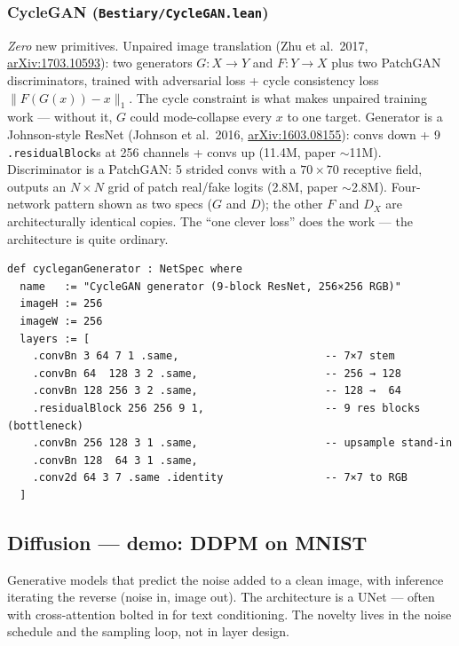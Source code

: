 \subsubsection*{CycleGAN (\texttt{Bestiary/CycleGAN.lean})}
\emph{Zero} new primitives. Unpaired image translation (Zhu et
al.\ 2017, \href{https://arxiv.org/abs/1703.10593}{arXiv:1703.10593}): two generators $G : X \to Y$ and $F : Y \to X$ plus two
PatchGAN discriminators, trained with adversarial loss + cycle
consistency loss $\|F(G(x)) - x\|_1$. The cycle constraint is what
makes unpaired training work --- without it, $G$ could mode-collapse
every $x$ to one target. Generator is a Johnson-style ResNet (Johnson et al.\ 2016,
\href{https://arxiv.org/abs/1603.08155}{arXiv:1603.08155}):
convs down + 9 \texttt{.residualBlock}s at 256 channels + convs up
(11.4M, paper $\sim$11M). Discriminator is a PatchGAN: 5 strided
convs with a $70 \times 70$ receptive field, outputs an $N \times N$
grid of patch real/fake logits (2.8M, paper $\sim$2.8M). Four-network
pattern shown as two specs ($G$ and $D$); the other $F$ and
$D_X$ are architecturally identical copies. The ``one clever loss''
does the work --- the architecture is quite ordinary.

\begin{verbatim}
def cycleganGenerator : NetSpec where
  name   := "CycleGAN generator (9-block ResNet, 256×256 RGB)"
  imageH := 256
  imageW := 256
  layers := [
    .convBn 3 64 7 1 .same,                       -- 7×7 stem
    .convBn 64  128 3 2 .same,                    -- 256 → 128
    .convBn 128 256 3 2 .same,                    -- 128 →  64
    .residualBlock 256 256 9 1,                   -- 9 res blocks (bottleneck)
    .convBn 256 128 3 1 .same,                    -- upsample stand-in
    .convBn 128  64 3 1 .same,
    .conv2d 64 3 7 .same .identity                -- 7×7 to RGB
  ]
\end{verbatim}

\subsection{Diffusion --- demo: DDPM on MNIST}
\label{sec:bestiary_diffusion}

Generative models that predict the noise added to a clean image, with inference
iterating the reverse (noise in, image out). The architecture is a UNet ---
often with cross-attention bolted in for text conditioning. The novelty lives in
the noise schedule and the sampling loop, not in layer design.

